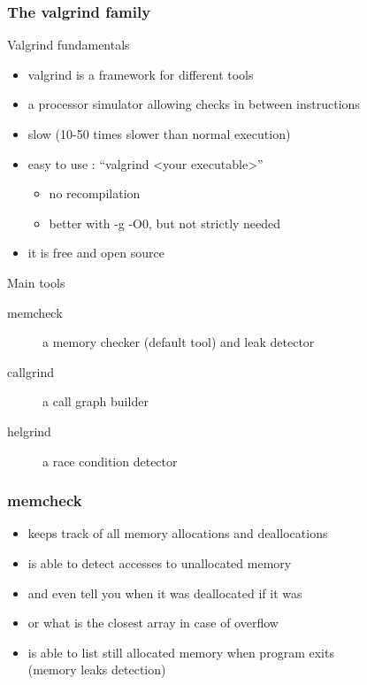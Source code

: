 \begin{frame}[fragile]
  \frametitle{The valgrind family}
  \begin{block}{Valgrind fundamentals}
    \begin{itemize}
    \item valgrind is a framework for different tools
    \item a processor simulator allowing checks in between instructions
    \item slow (10-50 times slower than normal execution)
    \item easy to use : ``valgrind \textless{}your executable\textgreater''
      \begin{itemize}
      \item no recompilation
      \item better with -g -O0, but not strictly needed
      \end{itemize}
    \item it is free and open source
    \end{itemize}
  \end{block}
  \pause
  \begin{block}{Main tools}
    \begin{description}
      \item[memcheck] a memory checker (default tool) and leak detector
      \item[callgrind] a call graph builder
      \item[helgrind] a race condition detector
    \end{description}
  \end{block}
\end{frame}

\begin{frame}[fragile]
  \frametitle{memcheck}
  \begin{block}{}
    \begin{itemize}
      \item keeps track of all memory allocations and deallocations
      \item is able to detect accesses to unallocated memory
      \item and even tell you when it was deallocated if it was
      \item or what is the closest array in case of overflow
      \item is able to list still allocated memory when program exits\\
        (memory leaks detection)
    \end{itemize}
  \end{block}
\end{frame}

